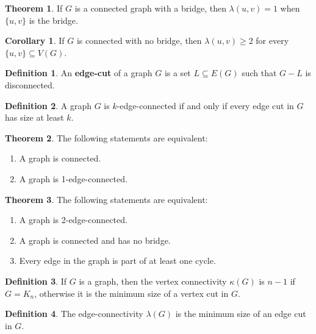 \documentclass{article}
\theoremstyle{definition}
\newtheorem{theorem}{Theorem}
\newtheorem{corollary}{Corollary}
\newtheorem{definition}{Definition}
\begin{document}
\begin{theorem}
If $G$ is a connected graph with a bridge, then $\lambda(u,v) = 1$ when $\{u,v\}$ is the bridge.
\end{theorem}

\begin{corollary}
If $G$ is connected with no bridge, then $\lambda(u,v) \geq 2$ for every $\{u,v\} \subseteq V(G)$.
\end{corollary}

\begin{definition}
An \textbf{edge-cut} of a graph $G$ is a set $L \subseteq E(G)$ such that $G - L$ is disconnected.
\end{definition}

\begin{definition}
A graph $G$ is $k$-edge-connected if and only if every edge cut in $G$ has size at least $k$.
\end{definition}

\begin{theorem}
The following statements are equivalent:
\begin{enumerate}
\item A graph is connected.
\item A graph is 1-edge-connected.
\end{enumerate}
\end{theorem}

\begin{theorem}
The following statements are equivalent:
\begin{enumerate}
\item A graph is 2-edge-connected.
\item A graph is connected and has no bridge.
\item Every edge in the graph is part of at least one cycle.
\end{enumerate}
\end{theorem}

\begin{definition}
If $G$ is a graph, then the vertex connectivity $\kappa(G)$ is $n-1$ if $G = K_n$, otherwise it is the minimum size of a vertex cut in $G$.
\end{definition}

\begin{definition}
The edge-connectivity $\lambda(G)$ is the minimum size of an edge cut in $G$.
\end{definition}
\end{document}
